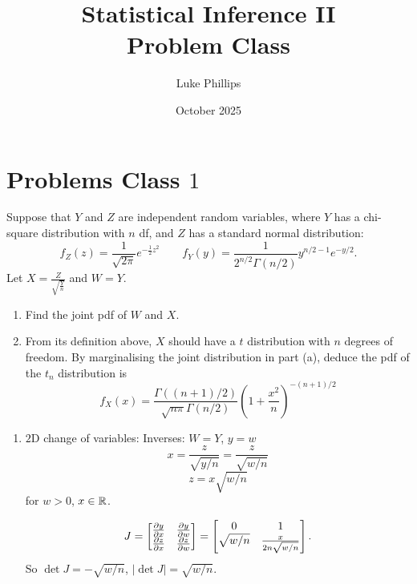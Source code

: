 \documentclass[10pt, a4paper]{article}
\title{Statistical Inference II \\
    \large Problem Class}
\author{Luke Phillips}
\date{October 2025}
\begin{document}
\maketitle

\newpage

\tableofcontents

\newpage

\section{Problems Class \texorpdfstring{$1$}{}}

\begin{problem}
    Suppose that $Y$ and $Z$ are independent random variables,
    where $Y$ has a chi-square distribution with $n$ df,
    and $Z$ has a standard normal distribution:
    \[
    f_Z(z) = \frac{1}{\sqrt{2\pi}}e ^ {-\frac{1}{2}z ^ 2}\qquad 
    f_Y(y) = \frac{1}{2 ^ {n / 2}\Gamma(n / 2)}y ^ {n / 2 - 1}e ^ {-y / 2}.
    \]
    Let $X = \frac{Z}{\sqrt{\frac{Y}{n}}}$ and $W = Y$.

    \begin{enumerate}[label = (\alph*)]
        \item Find the joint pdf of $W$ and $X$.

        \item From its definition above,
        $X$ should have a $t$ distribution with $n$ degrees of freedom.
        By marginalising the joint distribution in part (a),
        deduce the pdf of the $t_n$ distribution is
        \[
        f_{X}(x) = \frac{\Gamma((n + 1) / 2)}{\sqrt{n\pi}\Gamma(n / 2)}\left(1 + \frac{x ^ 2}{n}\right) ^ {-(n + 1) / 2}
        \]
    \end{enumerate}

    \begin{solution}
        \begin{enumerate}[label = (\alph*)]
            \item
            $2$D change of variables:
            Inverses:
            $W = Y$,
            $y = w$
            \[
            x = \frac{z}{\sqrt{y / n}} = \frac{z}{\sqrt{w / n}}
            \]
            \[
            z = x\sqrt{w / n}
            \]
            for $w > 0$,
            $x \in \R$.

            \[
            J = \begin{bmatrix}
                \pd[y]{x} & \pd[y]{w} \\ \pd[z]{x} & \pd[z]{w}
            \end{bmatrix} = \begin{bmatrix}
                0 & 1 \\ \sqrt{w / n} & \frac{x}{2n\sqrt{w / n}}
            \end{bmatrix}.
            \]
            So $\det{J} = -\sqrt{w / n}$,
            $|\det{J}| = \sqrt{w / n}$.


\end{enumerate}
\end{solution}
\end{problem}
\end{document}

